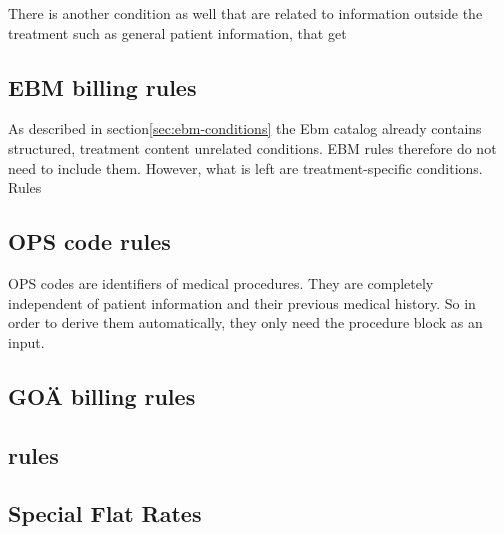 There is another condition
as well that are related to information outside the treatment such as general patient information,
that get

\subsection{EBM billing rules}\label{subsec:ebm-billing-rules}
As described in section\ref{sec:ebm-conditions} the Ebm catalog already contains structured,
treatment content unrelated conditions.
EBM rules therefore do not need to include them.
However, what is left are treatment-specific conditions.
Rules

\subsection{OPS code rules}\label{subsec:ops-code-rules}
OPS codes are identifiers of medical procedures.
They are completely independent of patient information and their previous medical history.
So in order to derive them automatically, they only need the procedure block as an input.

\subsection{GOÄ billing rules}\label{subsec:goa-billing-rules}

\subsection{\MJ rules}\label{subsec:multiplier-justification-rules}

\subsection{Special Flat Rates}\label{subsec:special-flat-rates}

